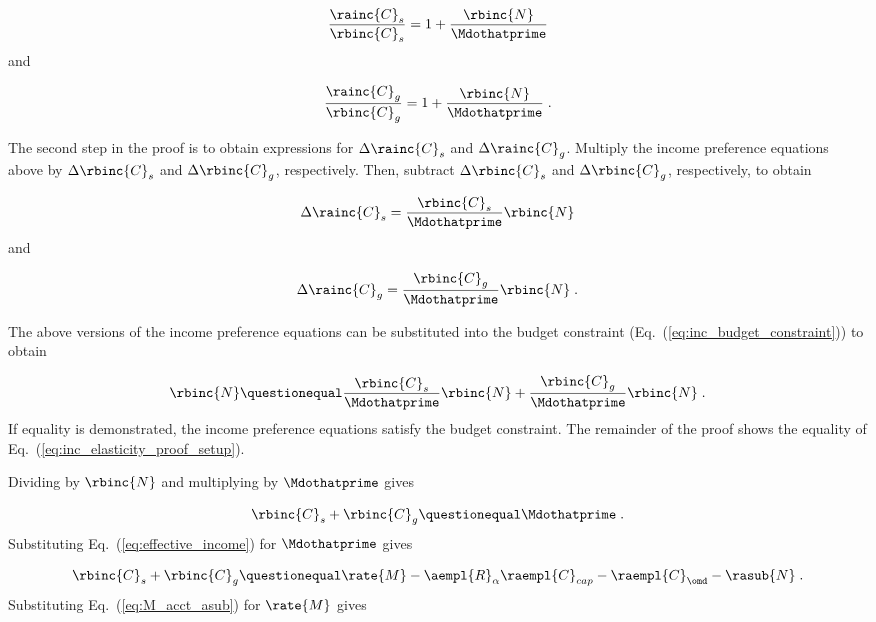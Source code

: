 \begin{equation}
    \frac{\rainc{C}_s}{\rbinc{C}_s} = 1 + \frac{\rbinc{N}}{\Mdothatprime}
\end{equation}
%
and

\begin{equation}
  \frac{\rainc{C}_g}{\rbinc{C}_g} = 1 + \frac{\rbinc{N}}{\Mdothatprime} \; .
\end{equation}
%

The second step in the proof is to obtain expressions 
for $\Delta \rainc{C}_s$ and $\Delta \rainc{C}_g$.
Multiply the income preference equations above
by $\Delta \rbinc{C}_s$ and $\Delta \rbinc{C}_g$, respectively.
Then, subtract $\Delta \rbinc{C}_s$ and $\Delta \rbinc{C}_g$, respectively, 
to obtain

\begin{equation}
  \Delta \rainc{C}_s = \frac{\rbinc{C}_s}{\Mdothatprime} \rbinc{N}
\end{equation}
%
and

\begin{equation}
  \Delta \rainc{C}_g = \frac{\rbinc{C}_g}{\Mdothatprime} \rbinc{N} \; .
\end{equation}

The above versions of the income preference equations 
can be substituted into the budget constraint
(Eq.~(\ref{eq:inc_budget_constraint})) to obtain

\begin{equation} \label{eq:inc_elasticity_proof_setup}
  \rbinc{N} \questionequal \frac{\rbinc{C}_s}{\Mdothatprime} \rbinc{N} 
                            + \frac{\rbinc{C}_g}{\Mdothatprime}  \rbinc{N} \; .
\end{equation}
%
If equality is demonstrated, 
the income preference equations satisfy the budget constraint.
The remainder of the proof shows the equality
of Eq.~(\ref{eq:inc_elasticity_proof_setup}).

Dividing by $\rbinc{N}$ and multiplying by $\Mdothatprime$ gives

\begin{equation}
  \rbinc{C}_s + \rbinc{C}_g \questionequal \Mdothatprime \; .
\end{equation}
%
Substituting Eq.~(\ref{eq:effective_income}) for $\Mdothatprime$ gives

\begin{equation}
  \rbinc{C}_s + \rbinc{C}_g \questionequal \rate{M} - \aempl{R}_\alpha \raempl{C}_{cap} - \raempl{C}_{\omd} - \rasub{N} \; .
\end{equation}
%
Substituting Eq.~(\ref{eq:M_acct_asub}) for $\rate{M}$ gives

